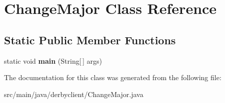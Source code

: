 \hypertarget{classChangeMajor}{}\section{Change\+Major Class Reference}
\label{classChangeMajor}
\subsection*{Static Public Member Functions}
\begin{DoxyCompactItemize}
\item 
\mbox{\label{classChangeMajor_a09cf5c2afa559f244e8f5649f66a0c2c}} 
static void {\bfseries main} (String\mbox{[}$\,$\mbox{]} args)
\end{DoxyCompactItemize}


The documentation for this class was generated from the following file\+:\begin{DoxyCompactItemize}
\item 
src/main/java/derbyclient/Change\+Major.\+java\end{DoxyCompactItemize}
